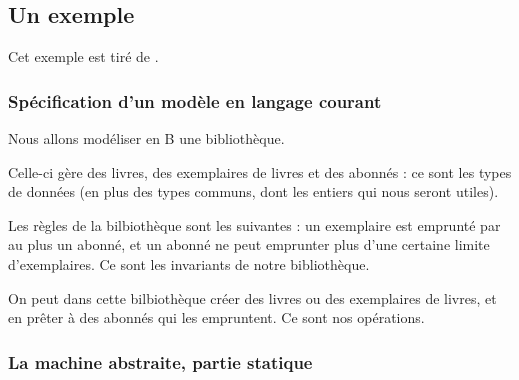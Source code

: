 \documentclass[10pt,a4paper]{article}
\newcommand{\Bequal}{\mathrel{\widehat{=}}}
\begin{document}

\subsection{Un exemple}

Cet exemple est tiré de \cite{introB}.


\subsubsection{Spécification d'un modèle en langage courant}

Nous allons modéliser en B une bibliothèque.

Celle-ci gère des livres, des exemplaires de livres et des abonnés : ce sont les types de données (en plus des types communs, dont les entiers qui nous seront utiles).

Les règles de la bilbiothèque sont les suivantes : un exemplaire est emprunté par au plus un abonné, et un abonné ne peut emprunter plus d'une certaine limite d'exemplaires. Ce sont les invariants de notre bibliothèque.

On peut dans cette bilbiothèque créer des livres ou des exemplaires de livres, et en prêter à des abonnés qui les empruntent. Ce sont nos opérations.

\subsubsection{La machine abstraite, partie statique}
\end{document}
